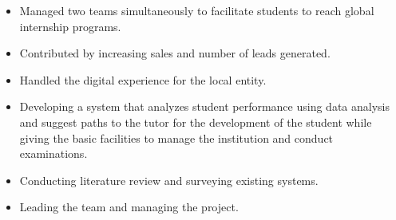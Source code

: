 \documentclass[10pt,a4paper]{altacv}
\begin{document}
\begin{itemize}
\item Managed two teams simultaneously to facilitate students to reach global internship programs.
\item Contributed by increasing sales and number of leads generated.
\item Handled the digital experience for the local entity.
\end{itemize}










\begin{itemize}
\item Developing a system that analyzes student performance using data analysis and suggest paths to the tutor for the development of the student while giving the basic facilities to manage the institution and conduct examinations.
\item Conducting literature review and surveying existing systems.
\item Leading the team and managing the project.
\end{itemize}
\end{document}
